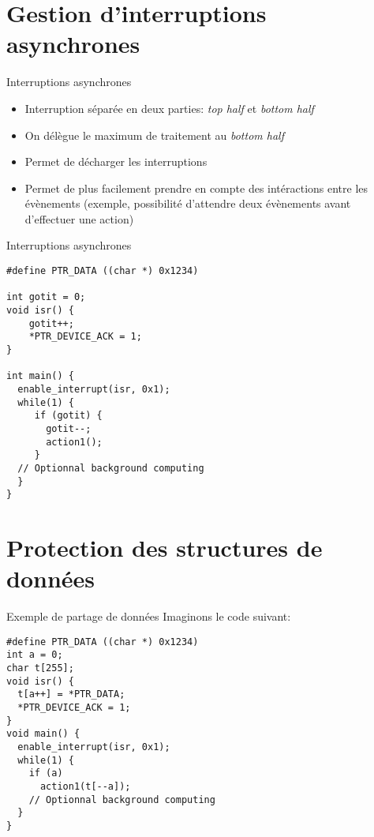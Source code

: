 \section{Gestion d'interruptions asynchrones}

\begin{frame}[fragile]{Interruptions asynchrones}
  \begin{itemize}
  \item  Interruption  séparée en  deux  parties:  \emph{top half}  et
    \emph{bottom half}
  \item On délègue le maximum de traitement au \emph{bottom half}
  \item Permet de décharger les interruptions
  \item Permet  de plus facilement prendre en  compte des intéractions
    entre  les   évènements  (exemple,  possibilité   d'attendre  deux
    évènements avant d'effectuer une action)
  \end{itemize}
\end{frame}

\begin{frame}[fragile]{Interruptions asynchrones}
  \begin{lstlisting}
#define PTR_DATA ((char *) 0x1234)

int gotit = 0;
void isr() {
    gotit++;
    *PTR_DEVICE_ACK = 1;
}

int main() {
  enable_interrupt(isr, 0x1);
  while(1) {
     if (gotit) {
       gotit--;
       action1();
     }
  // Optionnal background computing
  }
}
  \end{lstlisting}
\end{frame}

\section{Protection des structures de données}

\begin{frame}[fragile]{Exemple de partage de données}
  Imaginons le code suivant:
  \begin{lstlisting}
#define PTR_DATA ((char *) 0x1234)
int a = 0;
char t[255];
void isr() {
  t[a++] = *PTR_DATA;
  *PTR_DEVICE_ACK = 1;
}
void main() {
  enable_interrupt(isr, 0x1);
  while(1) {
    if (a)
      action1(t[--a]);
    // Optionnal background computing
  }
}
  \end{lstlisting}
\end{frame}

